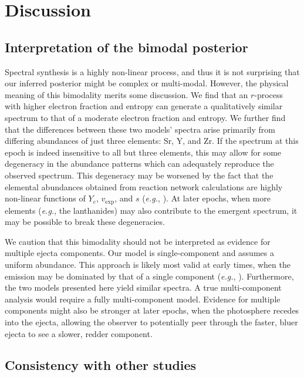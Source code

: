 \documentclass[twocolumn, twocolappendix]{aastex63}
\def\eg{{\it e.g.}}
\begin{document}

\section{Discussion}\label{sec:disco}


\subsection{Interpretation of the bimodal posterior}\label{ssc:bimodal}

Spectral synthesis is a highly non-linear process, and thus it is not surprising that our inferred posterior might be complex or multi-modal. However, the physical meaning of this bimodality merits some discussion. We find that an $r$-process with higher electron fraction and entropy can generate a qualitatively similar spectrum to that of a moderate electron fraction and entropy. We further find that the differences between these two models' spectra arise primarily from differing abundances of just three elements: Sr, Y, and Zr. If the spectrum at this epoch is indeed insensitive to all but three elements, this may allow for some degeneracy in the abundance patterns which can adequately reproduce the observed spectrum. This degeneracy may be worsened by the fact that the elemental abundances obtained from reaction network calculations are highly non-linear functions of $Y_e$, $v_{\mathrm{exp}}$, and $s$ (\eg, \citealt{wanajo14, lippuner15, wanajo18}). At later epochs, when more elements (\eg, the lanthanides) may also contribute to the emergent spectrum, it may be possible to break these degeneracies.  

We caution that this bimodality should not be interpreted as evidence for multiple ejecta components. Our model is single-component and assumes a uniform abundance. This approach is likely most valid at early times, when the emission may be dominated by that of a single component (\eg, \citealt{kasen17}). Furthermore, the two models presented here yield similar spectra. A true multi-component analysis would require a fully multi-component model. Evidence for multiple components might also be stronger at later epochs, when the photosphere recedes into the ejecta, allowing the observer to potentially peer through the faster, bluer ejecta to see a slower, redder component.


\subsection{Consistency with other studies}\label{ssc:comparison}
\end{document}
